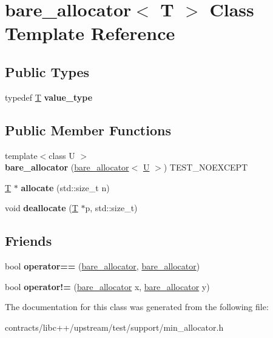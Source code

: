 \hypertarget{classbare__allocator}{}\section{bare\+\_\+allocator$<$ T $>$ Class Template Reference}
\label{classbare__allocator}
\subsection*{Public Types}
\begin{DoxyCompactItemize}
\item 
\mbox{\label{classbare__allocator_ac526716e455df6d1472d4743e0e2d08a}} 
typedef \mbox{\hyperlink{struct_t}{T}} {\bfseries value\+\_\+type}
\end{DoxyCompactItemize}
\subsection*{Public Member Functions}
\begin{DoxyCompactItemize}
\item 
\mbox{\label{classbare__allocator_a604333c3bd1934cb83eef3567d17f08b}} 
{\footnotesize template$<$class U $>$ }\\{\bfseries bare\+\_\+allocator} (\mbox{\hyperlink{classbare__allocator}{bare\+\_\+allocator}}$<$ \mbox{\hyperlink{union_u}{U}} $>$) T\+E\+S\+T\+\_\+\+N\+O\+E\+X\+C\+E\+PT
\item 
\mbox{\label{classbare__allocator_ad623744e0a904d9c787e79d9f79876f7}} 
\mbox{\hyperlink{struct_t}{T}} $\ast$ {\bfseries allocate} (std\+::size\+\_\+t n)
\item 
\mbox{\label{classbare__allocator_a344030780573255e760ef6a434b1d84a}} 
void {\bfseries deallocate} (\mbox{\hyperlink{struct_t}{T}} $\ast$p, std\+::size\+\_\+t)
\end{DoxyCompactItemize}
\subsection*{Friends}
\begin{DoxyCompactItemize}
\item 
\mbox{\label{classbare__allocator_afc29a615074a6b4f941395dce51dee32}} 
bool {\bfseries operator==} (\mbox{\hyperlink{classbare__allocator}{bare\+\_\+allocator}}, \mbox{\hyperlink{classbare__allocator}{bare\+\_\+allocator}})
\item 
\mbox{\label{classbare__allocator_a46983d2221b5424377356bfd63e65da6}} 
bool {\bfseries operator!=} (\mbox{\hyperlink{classbare__allocator}{bare\+\_\+allocator}} x, \mbox{\hyperlink{classbare__allocator}{bare\+\_\+allocator}} y)
\end{DoxyCompactItemize}


The documentation for this class was generated from the following file\+:\begin{DoxyCompactItemize}
\item 
contracts/libc++/upstream/test/support/min\+\_\+allocator.\+h\end{DoxyCompactItemize}
